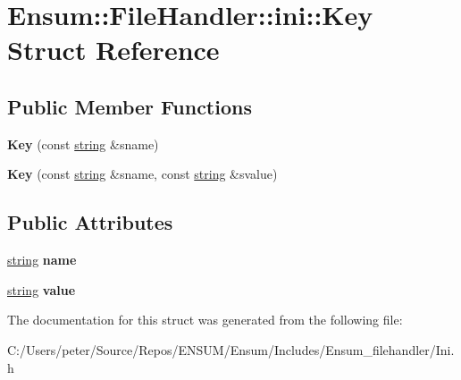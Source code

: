 \hypertarget{struct_ensum_1_1_file_handler_1_1ini_1_1_key}{}\section{Ensum\+:\+:File\+Handler\+:\+:ini\+:\+:Key Struct Reference}
\label{struct_ensum_1_1_file_handler_1_1ini_1_1_key}
\subsection*{Public Member Functions}
\begin{DoxyCompactItemize}
\item 
{\bfseries Key} (const \hyperlink{class_ensum_1_1string}{string} \&sname)\hypertarget{struct_ensum_1_1_file_handler_1_1ini_1_1_key_a10016f664c9ccb85aa8d382efac16794}{}\label{struct_ensum_1_1_file_handler_1_1ini_1_1_key_a10016f664c9ccb85aa8d382efac16794}

\item 
{\bfseries Key} (const \hyperlink{class_ensum_1_1string}{string} \&sname, const \hyperlink{class_ensum_1_1string}{string} \&svalue)\hypertarget{struct_ensum_1_1_file_handler_1_1ini_1_1_key_a8485c52051e07255bdc2f9ddb68ada91}{}\label{struct_ensum_1_1_file_handler_1_1ini_1_1_key_a8485c52051e07255bdc2f9ddb68ada91}

\end{DoxyCompactItemize}
\subsection*{Public Attributes}
\begin{DoxyCompactItemize}
\item 
\hyperlink{class_ensum_1_1string}{string} {\bfseries name}\hypertarget{struct_ensum_1_1_file_handler_1_1ini_1_1_key_a9307efc046f4e0d2dde327ae9c33221b}{}\label{struct_ensum_1_1_file_handler_1_1ini_1_1_key_a9307efc046f4e0d2dde327ae9c33221b}

\item 
\hyperlink{class_ensum_1_1string}{string} {\bfseries value}\hypertarget{struct_ensum_1_1_file_handler_1_1ini_1_1_key_ae9d1f184f0deb44980c2f73196d3f75e}{}\label{struct_ensum_1_1_file_handler_1_1ini_1_1_key_ae9d1f184f0deb44980c2f73196d3f75e}

\end{DoxyCompactItemize}


The documentation for this struct was generated from the following file\+:\begin{DoxyCompactItemize}
\item 
C\+:/\+Users/peter/\+Source/\+Repos/\+E\+N\+S\+U\+M/\+Ensum/\+Includes/\+Ensum\+\_\+filehandler/Ini.\+h\end{DoxyCompactItemize}
